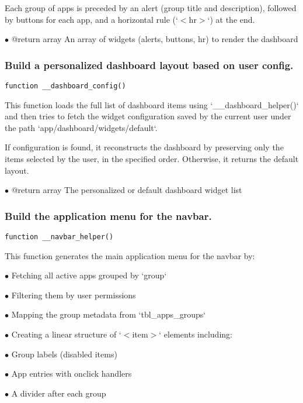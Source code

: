 \documentclass[a4paper]{article}
\begin{document}
Each group of apps is preceded by an alert (group title and description),
followed by buttons for each app, and a horizontal rule (`$<$hr$>$`) at the end.

\begin{compactitem}
\item[\color{myblue}$\bullet$] @return array An array of widgets (alerts, buttons, hr) to render the dashboard
\end{compactitem}

\hypertarget{toc60}{}
\subsubsection{Build a personalized dashboard layout based on user config.}

\begin{lstlisting}
function __dashboard_config()
\end{lstlisting}

This function loads the full list of dashboard items using `\_\_dashboard\_helper()`
and then tries to fetch the widget configuration saved by the current user
under the path `app/dashboard/widgets/default`.

If configuration is found, it reconstructs the dashboard by preserving only
the items selected by the user, in the specified order. Otherwise, it returns
the default layout.

\begin{compactitem}
\item[\color{myblue}$\bullet$] @return array The personalized or default dashboard widget list
\end{compactitem}

\hypertarget{toc61}{}
\subsubsection{Build the application menu for the navbar.}

\begin{lstlisting}
function __navbar_helper()
\end{lstlisting}

This function generates the main application menu for the navbar by:

\begin{compactitem}
\item[\color{myblue}$\bullet$] Fetching all active apps grouped by `group`
\item[\color{myblue}$\bullet$] Filtering them by user permissions
\item[\color{myblue}$\bullet$] Mapping the group metadata from `tbl\_apps\_groups`
\item[\color{myblue}$\bullet$] Creating a linear structure of `$<$item$>$` elements including:
  \begin{compactitem}
  \item[\color{myblue}$\bullet$] Group labels (disabled items)
  \item[\color{myblue}$\bullet$] App entries with onclick handlers
  \item[\color{myblue}$\bullet$] A divider after each group
  \end{compactitem}
\end{compactitem}
\end{document}
